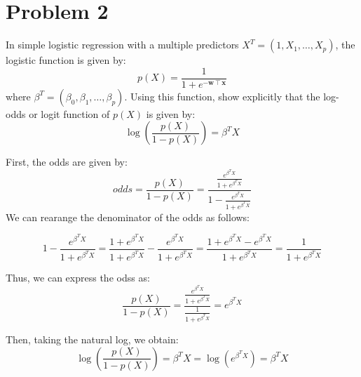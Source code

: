 \documentclass[11pt,twoside]{article}
\newcommand{\pts}[1]{\marginpar{ \small\hspace{0pt} \textit{[#1]} } }
\newcommand{\lt}{\left}
\newcommand{\rt}{\right}
\newcommand{\?}{\stackrel{?}{=}}
\newcommand{\fr}{\frac}
\newcommand{\bl}{\color{blue!80!black}}
\newenvironment{solution}
{\medskip\par\begin{adjustwidth}{.01\textwidth}{.01\textwidth}\bl}{\medskip\end{adjustwidth}}
\begin{document}


 

\bigskip

\section*{Problem 2 }

In simple logistic regression with a multiple predictors $X^T = (1, X_1,\ldots,X_p)$, \pts{4pts}
the logistic function is given by:
\begin{equation}
  \label{eq:1}
  p(X) = \fr{1}{1 + e^{-\bm w\intercal\bm x}}
\end{equation}
where $\beta^T = (\beta_0, \beta_1, \ldots, \beta_p) $.
Using this function, show explicitly that the log-odds or logit function of $p(X)$ is given by:
\begin{equation}
  \label{eq:2}
  \log\lt(\fr{p(X)}{1 - p(X)}\rt) = \beta^T X
\end{equation}


\begin{solution}
  First, the odds are given by:
  \begin{equation*}
 odds =\frac{p(X)}{1-p(X)}=\frac{\frac{e^{\beta^T X}}{1+e^{\beta^T X}}}{1-\frac{e^{\beta^T X}}{1+e^{\beta^T X}}}
\end{equation*}
We can rearange the denominator of the odds as follows:
 
\begin{equation*}
1-\frac{e^{\beta^T X}}{1+e^{\beta^T X}}=\frac{1+e^{\beta^T X}}{1+e^{\beta^T X}}-\frac{e^{\beta^T X}}{1+e^{\beta^T X}}=\frac{1+e^{\beta^T X}-e^{\beta^T X}}{1+e^{\beta^T X}}=\frac{1}{1+e^{\beta^T X}}
\end{equation*}

Thus, we can express the odss as: 
\begin{equation*}
\frac{p(X)}{1-p(X)} = \frac{\frac{e^{\beta^T X}}{1+e^{\beta^T X}}}{\frac{1}{1+e^{\beta^T X}}} = e^{\beta^T X}
\end{equation*}

Then, taking the natural log, we obtain:
\begin{equation*}
 \log\lt(\fr{p(X)}{1 - p(X)}\rt) = \beta^T X = \log(e^{\beta^T X})=\beta^T X
\end{equation*}
\end{solution}
\end{document}
